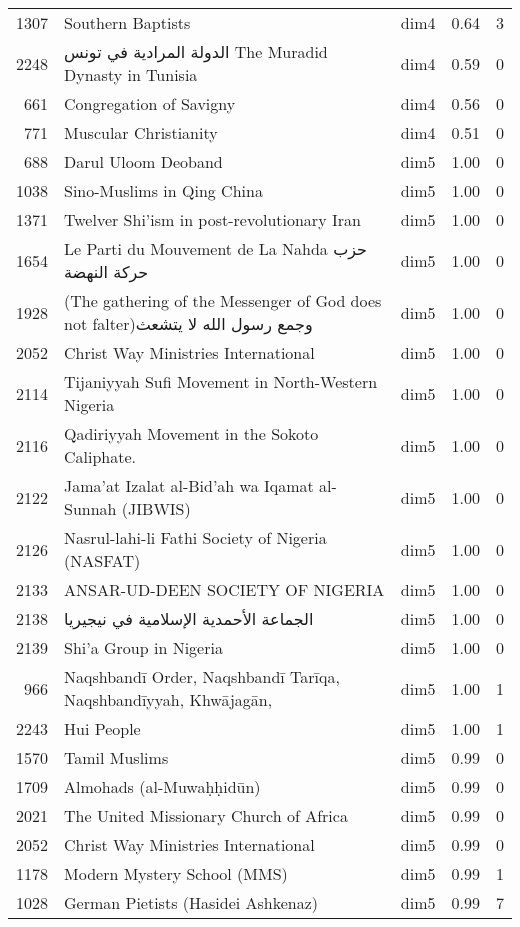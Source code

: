 \begin{tabular}{rllrr}
1307 & Southern Baptists & dim4 & 0.64 & 3 \\
2248 & الدولة المرادية في تونس The Muradid Dynasty in Tunisia & dim4 & 0.59 & 0 \\
661 & Congregation of Savigny & dim4 & 0.56 & 0 \\
771 & Muscular Christianity & dim4 & 0.51 & 0 \\
688 & Darul Uloom Deoband & dim5 & 1.00 & 0 \\
1038 & Sino-Muslims in Qing China & dim5 & 1.00 & 0 \\
1371 & Twelver Shi'ism in post-revolutionary Iran & dim5 & 1.00 & 0 \\
1654 & Le Parti du Mouvement de La Nahda حزب حركة النهضة & dim5 & 1.00 & 0 \\
1928 & (The gathering of the Messenger of God does not falter)وجمع رسول الله لا يتشعث & dim5 & 1.00 & 0 \\
2052 & Christ Way Ministries International & dim5 & 1.00 & 0 \\
2114 & Tijaniyyah Sufi Movement in North-Western Nigeria & dim5 & 1.00 & 0 \\
2116 & Qadiriyyah Movement in the Sokoto Caliphate. & dim5 & 1.00 & 0 \\
2122 & Jama'at Izalat al-Bid'ah wa Iqamat al-Sunnah (JIBWIS) & dim5 & 1.00 & 0 \\
2126 & Nasrul-lahi-li Fathi Society of Nigeria (NASFAT) & dim5 & 1.00 & 0 \\
2133 & ANSAR-UD-DEEN SOCIETY OF NIGERIA & dim5 & 1.00 & 0 \\
2138 & الجماعة الأحمدية الإسلامية في نيجيريا & dim5 & 1.00 & 0 \\
2139 & Shi'a Group in Nigeria & dim5 & 1.00 & 0 \\
966 & Naqshbandī Order, Naqshbandī Tarīqa, Naqshbandīyyah, Khwājagān, & dim5 & 1.00 & 1 \\
2243 & Hui People & dim5 & 1.00 & 1 \\
1570 & Tamil Muslims & dim5 & 0.99 & 0 \\
1709 & Almohads (al-Muwaḥḥidūn) & dim5 & 0.99 & 0 \\
2021 & The United Missionary Church of Africa & dim5 & 0.99 & 0 \\
2052 & Christ Way Ministries International & dim5 & 0.99 & 0 \\
1178 & Modern Mystery School (MMS) & dim5 & 0.99 & 1 \\
1028 & German Pietists (Hasidei Ashkenaz) & dim5 & 0.99 & 7 \\

\end{tabular}
